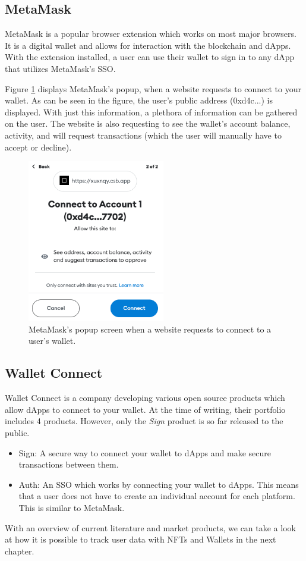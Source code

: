 \subsection{MetaMask}
\label{sec:sota:metaMask}
MetaMask is a popular browser extension which works on most major browsers. It is a digital wallet and allows for interaction with the blockchain and dApps. With the extension installed, a user can use their wallet to sign in to any dApp that utilizes MetaMask's SSO. \cite{metaMask}

Figure \ref{fig:metamaskPopup} displays MetaMask's popup, when a website requests to connect to your wallet. As can be seen in the figure, the user's public address (0xd4c...) is displayed. With just this information, a plethora of information can be gathered on the user. The website is also requesting to see the wallet's account balance, activity, and will request transactions (which the user will manually have to accept or decline).

\begin{figure}[t]
\includegraphics[width=6cm]{./gfx/metamaskPopup.png}
\centering
\caption{MetaMask's popup screen when a website requests to connect to a user's wallet.}
\label{fig:metamaskPopup}
\end{figure}


\subsection{Wallet Connect}
\label{sec:sota:walletConnect}
Wallet Connect \cite{walletConnect} is a company developing various open source products which allow dApps to connect to your wallet. At the time of writing, their portfolio includes 4 products. However, only the \textit{Sign} product is so far released to the public.

\begin{itemize}
	\item Sign: A secure way to connect your wallet to dApps and make secure transactions between them. \cite{walletConnect}
	\item Auth: An SSO which works by connecting your wallet to dApps. This means that a user does not have to create an individual account for each platform. This is similar to MetaMask. \cite{walletConnect}
\end{itemize}

With an overview of current literature and market products, we can take a look at how it is possible to track user data with NFTs and Wallets in the next chapter.